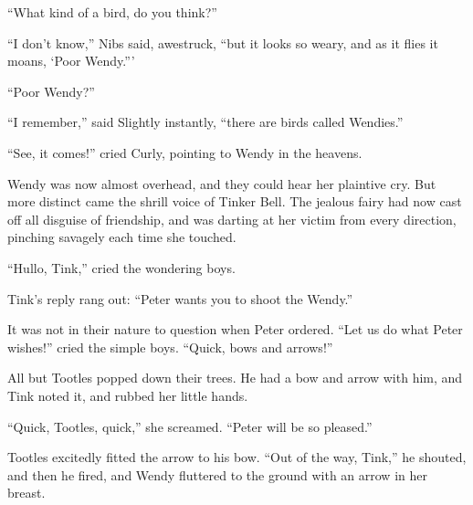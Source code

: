 ``What kind of a bird, do you think?''

``I don't know,'' Nibs said, awestruck, ``but it looks so weary, and as it
flies it moans, ‘Poor Wendy.'''

``Poor Wendy?''

``I remember,'' said Slightly instantly, ``there are birds called
Wendies.''

``See, it comes!'' cried Curly, pointing to Wendy in the heavens.

Wendy was now almost overhead, and they could hear her plaintive cry.
But more distinct came the shrill voice of Tinker Bell. The jealous
fairy had now cast off all disguise of friendship, and was darting at
her victim from every direction, pinching savagely each time she
touched.

``Hullo, Tink,'' cried the wondering boys.

Tink's reply rang out: ``Peter wants you to shoot the Wendy.''

It was not in their nature to question when Peter ordered. ``Let us do
what Peter wishes!'' cried the simple boys. ``Quick, bows and arrows!''

All but Tootles popped down their trees. He had a bow and arrow with
him, and Tink noted it, and rubbed her little hands.

``Quick, Tootles, quick,'' she screamed. ``Peter will be so pleased.''

Tootles excitedly fitted the arrow to his bow. ``Out of the way, Tink,''
he shouted, and then he fired, and Wendy fluttered to the ground with
an arrow in her breast.





